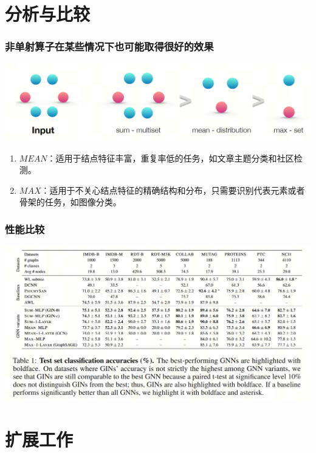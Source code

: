 \documentclass{beamer}
\begin{document}
\section{分析与比较}

\begin{frame}

  \frametitle{非单射算子在某些情况下也可能取得很好的效果}
  \includegraphics[scale=0.3]{figs/other.png}
  \begin{enumerate}
    \item $MEAN$：适用于结点特征丰富，重复率低的任务，如文章主题分类和社区检测。
    \item $MAX$：适用于不关心结点特征的精确结构和分布，只需要识别代表元素或者骨架的任务，如图像分类。
  \end{enumerate}

\end{frame}

\begin{frame}

  \frametitle{性能比较}
  \includegraphics[scale=0.25]{figs/test.png}

\end{frame}

\section{扩展工作}
\end{document}

